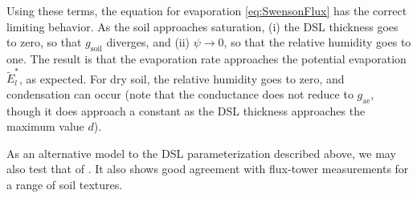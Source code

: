 \documentclass[twoside,10pt]{report}
\begin{document}
Using these terms, the equation for evaporation \eqref{eq:SwensonFlux} has the correct limiting behavior. As the soil approaches saturation, (i) the DSL thickness goes to zero, so that $g_{\mathrm{soil}}$ diverges, and (ii) $\psi \rightarrow 0$, so that the relative humidity goes to one. The result is that the evaporation rate approaches the potential evaporation $\tilde{E}_l^*$, as expected. For dry soil, the relative humidity goes to zero, and condensation can occur (note that the conductance does not reduce to $g_{\mathrm{ae}}$, though it does approach a constant as the DSL thickness approaches the maximum value $d$).

As an alternative model to the DSL parameterization described above, we may also test that of \citet{Lehmann18a}.  It also shows good agreement with flux-tower measurements for a range of soil textures. 




\end{document}

